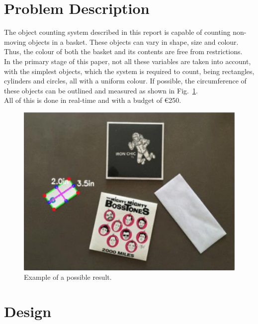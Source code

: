\documentclass[11pt]{article}
\begin{document}
\section{Problem Description}
The object counting system described in this report is capable of counting non-moving objects in a basket. These objects can vary in shape, size and colour. Thus, the colour of both the basket and its contents are free from restrictions.\\
In the primary stage of this paper, not all these variables are taken into account, with the simplest objects, which the system is required to count, being rectangles, cylinders and circles, all with a uniform colour. If possible, the circumference of these objects can be outlined and measured as shown in Fig.~\ref{fig:example}.\\ All of this is done in real-time and with a budget of \euro 250.
\begin{figure}[h]
\centering
\includegraphics[width=0.7\linewidth]{opdracht.png}
\caption{Example of a possible result.}
\label{fig:example}
\end{figure}

\section{Design}
\end{document}
